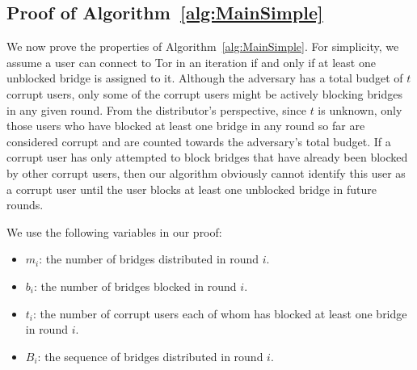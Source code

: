 \subsection{Proof of Algorithm~\ref{alg:MainSimple}} \label{sec:ProofSimple}
We now prove the properties of Algorithm~\ref{alg:MainSimple}. 
For simplicity, we assume a user can connect to Tor in an iteration if and only if at least one unblocked bridge is assigned to it. 
Although the adversary has a total budget of $t$ corrupt users, only some of the corrupt users might be actively blocking bridges in any given round. From the distributor's perspective, since $t$ is unknown, only those users who have blocked at least one bridge in any round so far are considered corrupt and are counted towards the adversary's total budget. If a corrupt user has only attempted to block bridges that have already been blocked by other corrupt users, then our algorithm obviously cannot identify this user as a corrupt user until the user blocks at least one unblocked bridge in future rounds.

We use the following variables in our proof:
\begin{itemize}
	\item $m_i$: the number of bridges distributed in round $i$.
	\item $b_i$: the number of bridges blocked in round $i$.
	\item $t_i$: the number of corrupt users each of whom has blocked at least one bridge in round $i$.
	\item $B_i$: the sequence of bridges distributed in round $i$.
\end{itemize}

%

